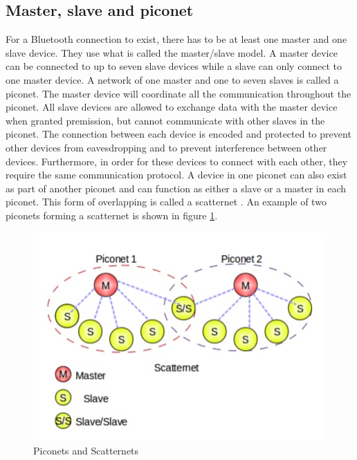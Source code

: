 \documentclass[a4paper, 11pt]{report}
\begin{document}
	\subsection{Master, slave and piconet}
For a Bluetooth connection to exist, there has to be at least one master and one slave device. They use what is called the master/slave model. A master device can be connected to up to seven slave devices while a slave can only connect to one master device. A network of one master and one to seven slaves is called a piconet. The master device will coordinate all the communication throughout the piconet. All slave devices are allowed to exchange data with the master device when granted premission, but cannot communicate with other slaves in the piconet. The connection between each device is encoded and protected to prevent other devices from eavesdropping and to prevent interference between other devices. Furthermore, in order for these devices to connect with each other, they require the same communication protocol. A device in one piconet can also exist as part of another piconet and can function as either a slave or a master in each piconet. This form of overlapping is called a scatternet \cite{introBluetooth}. An example of two piconets forming a scatternet is shown in figure \ref{fig:scatternet}.

	\begin{figure}[ht]
		\centering	
		\includegraphics[scale=0.60]{images/scatternet.pdf} 
		\caption{Piconets and Scatternets}\label{fig:scatternet}
	\end{figure}
\end{document}
